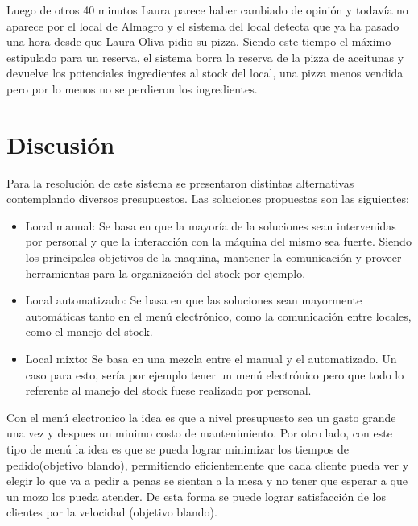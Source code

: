 \documentclass[a4paper,10pt]{article}
\begin{document}
Luego de otros 40 minutos Laura parece haber cambiado de opini\'on y todav\'ia no aparece por el local de Almagro y
el sistema del local detecta que ya ha pasado una hora desde que Laura Oliva pidio su pizza. Siendo este
tiempo el m\'aximo estipulado para un reserva, el sistema borra la reserva de la pizza de aceitunas y devuelve los potenciales ingredientes
al stock del local, una pizza menos vendida pero por lo menos no se perdieron los ingredientes.



\newpage


\section*{Discusi\'on}

Para la resoluci\'on de este sistema se presentaron distintas alternativas contemplando diversos presupuestos. Las soluciones propuestas son las siguientes:
\begin{itemize}
\item Local manual: Se basa en que la mayor\'ia de la soluciones sean intervenidas por personal y que la interacci\'on con la m\'aquina del mismo sea fuerte.
Siendo los principales objetivos de la maquina, mantener la comunicaci\'on y proveer herramientas para la organizaci\'on del stock por ejemplo.
\item Local automatizado: Se basa en que las soluciones sean mayormente autom\'aticas tanto en el men\'u electr\'onico, como la comunicaci\'on entre locales, como el manejo del stock.
\item Local mixto: Se basa en una mezcla entre el manual y el automatizado. Un caso para esto, ser\'ia por ejemplo tener un men\'u electr\'onico pero que todo lo referente al manejo del stock fuese realizado por personal.
\end{itemize}


Con el men\'u electronico la idea es que a nivel presupuesto sea un gasto grande una vez y despues un minimo costo de mantenimiento. 
Por otro lado, con este tipo de men\'u la idea es que se pueda lograr minimizar los tiempos de pedido(objetivo blando), 
permitiendo eficientemente que cada cliente pueda ver y elegir lo que va a pedir a penas se sientan a la mesa y no tener que esperar a 
que un mozo los pueda atender. De esta forma se puede lograr satisfacci\'on de los clientes por la velocidad (objetivo blando). 
\end{document}
